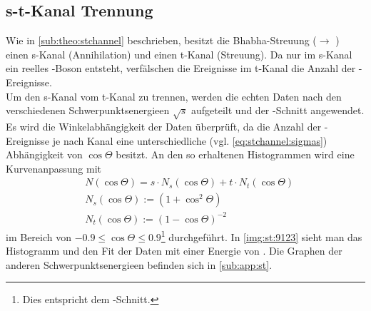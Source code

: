 \subsection{s-t-Kanal Trennung}
Wie in \autoref{sub:theo:stchannel} beschrieben, besitzt die Bhabha-Streuung (\ee $\to$ \ee) einen s-Kanal (Annihilation)
und einen t-Kanal (Streuung). Da nur im s-Kanal ein reelles \Z -Boson entsteht, verfälschen die Ereignisse im t-Kanal die Anzahl
der \ee -Ereignisse. \\
Um den s-Kanal vom t-Kanal zu trennen, werden die echten Daten nach den verschiedenen Schwerpunktsenergieen $\sqrt{s}$ aufgeteilt und
der \ee -Schnitt angewendet. Es wird die Winkelabhängigkeit der Daten überprüft, da die Anzahl der \ee -Ereignisse
je nach Kanal eine unterschiedliche (vgl. \autoref{eq:stchannel:sigmas}) Abhängigkeit von $\cos \Theta$ besitzt. An den so erhaltenen Histogrammen wird
eine Kurvenanpassung mit
\begin{equation}
    \begin{split}
        & N(\cos \Theta) = s \cdot N_s(\cos \Theta ) + t \cdot N_t(\cos \Theta) \\
        & N_s(\cos \Theta) := \left( 1 + \cos^2 \Theta \right) \\
        & N_t (\cos \Theta) := \left( 1 - \cos \Theta \right)^{-2}
    \end{split}
\end{equation}
im Bereich von $-0.9 \leq \cos \Theta \leq 0.9$\footnote{Dies entspricht dem \ee -Schnitt.} durchgeführt. In \autoref{img:st:9123} sieht man
das Histogramm und den Fit der Daten mit einer Energie von . Die Graphen der anderen Schwerpunktsenergieen befinden sich in
\autoref{sub:app:st}.

